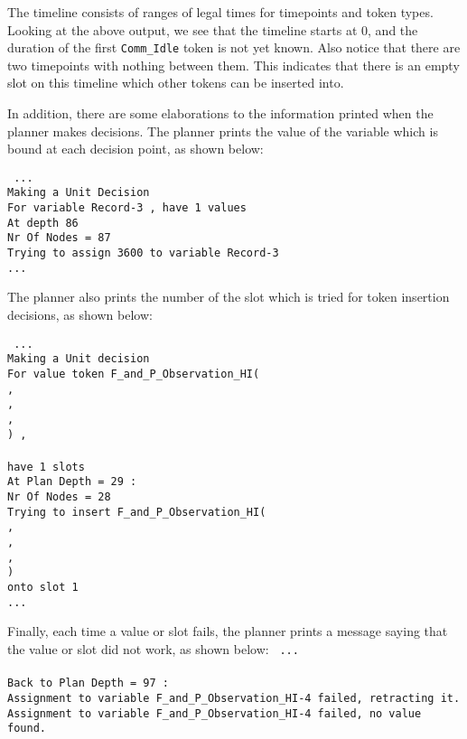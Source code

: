 The timeline consists of ranges of legal times for timepoints and token types.
Looking at the above output,  we see that the timeline starts at 0, and the
duration of the first {\tt Comm\_Idle} token is not yet known.  Also notice that
there are two timepoints with nothing between them.  This indicates that there
is an empty slot on this timeline which other tokens can be inserted into.

In addition, there are some elaborations to the information printed when the
planner makes decisions.  The planner prints the value of the variable which
is bound at each decision point, as shown below:

{\tt
\noindent... \\
Making a Unit Decision\\
For variable Record-3 , have 1 values\\
At depth 86\\
Nr Of Nodes = 87\\
Trying to assign 3600 to variable Record-3\\
...}

The planner also prints the number of the slot which is tried for token insertion
decisions, as shown below:

{\tt
\noindent... \\
Making a Unit decision\\
For value token F\_and\_P\_Observation\_HI( \\
\indent [0,+INF], \\
, \\
\indent [0,+INF], \\
) , \\
\\have 1 slots\\
At Plan Depth = 29 :\\
Nr Of Nodes = 28\\
Trying to insert F\_and\_P\_Observation\_HI( \\
\indent [0,+INF], \\
, \\
\indent [0,+INF], \\
)\\
onto slot 1\\
...}

Finally, each time a value or slot fails, the planner prints a message saying
that the value or slot did not work, as shown below:
{\tt
...\\
\noindent\\
Back to Plan Depth = 97 :\\
Assignment to variable F\_and\_P\_Observation\_HI-4 failed, retracting it.\\
Assignment to variable F\_and\_P\_Observation\_HI-4 failed, no value found.\\
}



